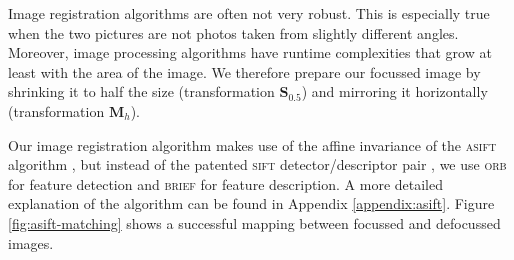 \documentclass[11.5pt]{book}
\begin{document}
Image registration algorithms are often not very robust. This is especially true
when the two pictures are not photos taken from slightly different angles.
Moreover, image processing algorithms have runtime complexities that grow at
least with the area of the image. We therefore prepare our focussed image by
shrinking it to half the size (transformation $\mathbf{S}_{0.5}$) and mirroring
it horizontally (transformation $\mathbf{M}_h$).

Our image registration algorithm makes use of the affine invariance of the
\textsc{asift}
algorithm \cite{}, but instead of the patented \textsc{sift} detector/descriptor pair
\cite{}, we use \textsc{orb} \cite{} for feature detection and \textsc{brief} \cite{} for feature
description. A more detailed explanation of the algorithm can be found in
Appendix \ref{appendix:asift}. Figure \ref{fig:asift-matching} shows a
successful mapping between focussed and defocussed images.
\end{document}
